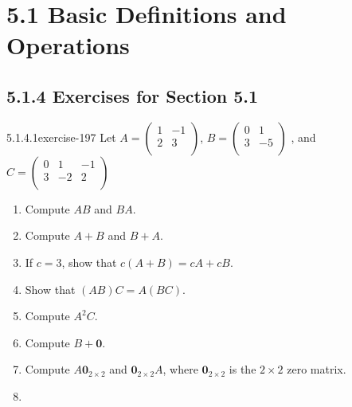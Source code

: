 \documentclass[twoside,10pt,]{book}
\numberwithin{equation}{section}
\begin{document}
\section*{5.1 Basic Definitions and Operations}
\subsection*{5.1.4 Exercises for Section 5.1}
\begin{divisionsolution}{5.1.4.1}{}{exercise-197}%
\hypertarget{p-1735}{}%
Let \(A=\left(
\begin{array}{cc}
1 & -1 \\
2 & 3 \\
\end{array}
\right)\), \(B =\left(
\begin{array}{cc}
0 & 1 \\
3 & -5 \\
\end{array}
\right)\) , and \(C=\left(
\begin{array}{ccc}
0 & 1 & -1 \\
3 & -2 & 2 \\
\end{array}
\right)\)%
\par
\hypertarget{p-1736}{}%
\leavevmode%
\begin{enumerate}[label=(\alph*)]
\item\hypertarget{li-908}{}\hypertarget{p-1737}{}%
Compute \(A B\) and \(B A\).%
\item\hypertarget{li-909}{}\hypertarget{p-1738}{}%
Compute \(A + B\) and \(B + A\).%
\item\hypertarget{li-910}{}\hypertarget{p-1739}{}%
If \(c = 3\), show that \(c(A + B) = c A + c B\).%
\item\hypertarget{li-911}{}\hypertarget{p-1740}{}%
Show that \((A B)C = A(B C)\).%
\item\hypertarget{li-912}{}\hypertarget{p-1741}{}%
Compute \(A^2 C\).%
\item\hypertarget{li-913}{}\hypertarget{p-1742}{}%
Compute \(B + \pmb{0}\).%
\item\hypertarget{li-914}{}\hypertarget{p-1743}{}%
Compute \(A \pmb{0}_{2\times 2}\) and \(\pmb{0}_{2\times 2} A\), where \(\pmb{0}_{2\times 2}\) is the \(2\times 2\) zero matrix.%
\item\hypertarget{li-915}{}\hypertarget{p-1744}{}%

\end{enumerate}
\end{divisionsolution}
\end{document}
